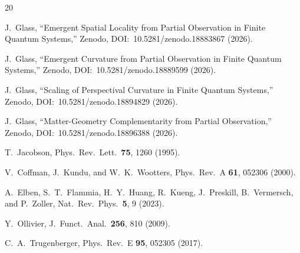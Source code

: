 \documentclass[aps,pra,twocolumn,superscriptaddress,floatfix]{revtex4-2}
\begin{document}
\begin{thebibliography}{20}

J.~Glass, ``Emergent Spatial Locality from Partial Observation
in Finite Quantum Systems,''
Zenodo, DOI:~10.5281/zenodo.18883867 (2026).

J.~Glass, ``Emergent Curvature from Partial Observation
in Finite Quantum Systems,''
Zenodo, DOI:~10.5281/zenodo.18889599 (2026).

J.~Glass, ``Scaling of Perspectival Curvature in Finite
Quantum Systems,''
Zenodo, DOI:~10.5281/zenodo.18894829 (2026).

J.~Glass, ``Matter-Geometry Complementarity from Partial
Observation,''
Zenodo, DOI:~10.5281/zenodo.18896388 (2026).

T.~Jacobson,
Phys.\ Rev.\ Lett.\ \textbf{75}, 1260 (1995).

V.~Coffman, J.~Kundu, and W.~K.~Wootters,
Phys.\ Rev.\ A \textbf{61}, 052306 (2000).

A.~Elben, S.~T.~Flammia, H.~Y.~Huang, R.~Kueng,
J.~Preskill, B.~Vermersch, and P.~Zoller,
Nat.\ Rev.\ Phys.\ \textbf{5}, 9 (2023).

Y.~Ollivier,
J.\ Funct.\ Anal.\ \textbf{256}, 810 (2009).

C.~A.~Trugenberger,
Phys.\ Rev.\ E \textbf{95}, 052305 (2017).

\end{thebibliography}
\end{document}
